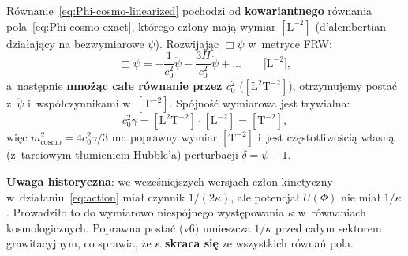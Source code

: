 \begin{remark}\label{rem:dim-mcosmo}
R\'ownanie~\eqref{eq:Phi-cosmo-linearized} pochodzi
od \textbf{kowariantnego} r\'ownania pola~\eqref{eq:Phi-cosmo-exact},
kt\'orego cz\l{}ony maj\k{a} wymiar $[\mathrm{L}^{-2}]$
(d'alembertian dzia\l{}aj\k{a}cy na bezwymiarowe $\psi$).
Rozwijaj\k{a}c $\Box\psi$ w~metryce FRW:
\[
  \Box\psi
  = -\frac{1}{c_0^2}\ddot\psi - \frac{3H}{c_0^2}\dot\psi
  + \ldots
  \qquad\bigl[\mathrm{L}^{-2}\bigr],
\]
a~nast\k{e}pnie \textbf{mno\.z\k{a}c ca\l{}e r\'ownanie przez $c_0^2$}
($[\mathrm{L}^{2}\mathrm{T}^{-2}]$), otrzymujemy posta\'c
z~$\ddot\psi$ i~wsp\'o\l{}czynnikami w~$[\mathrm{T}^{-2}]$.
Sp\'ojno\'s\'c wymiarowa jest trywialna:
\[
  c_0^2\gamma
  = [\mathrm{L}^{2}\mathrm{T}^{-2}] \cdot [\mathrm{L}^{-2}]
  = [\mathrm{T}^{-2}],
\]
wi\k{e}c $m_{\mathrm{cosmo}}^2 = 4c_0^2\gamma/3$
ma poprawny wymiar $[\mathrm{T}^{-2}]$
i~jest cz\k{e}stotliwo\'sci\k{a} w\l{}asn\k{a} (z~tarciowym
t\l{}umieniem Hubble'a) perturbacji $\delta = \psi - 1$.

\textbf{Uwaga historyczna}: we wcze\'sniejszych wersjach
cz\l{}on kinetyczny w~dzia\l{}aniu~\eqref{eq:action}
mia\l{} czynnik $1/(2\kappa)$, ale potencja\l{} $U(\Phi)$
nie mia\l{} $1/\kappa$. Prowadzi\l{}o to do wymiarowo
niespójnego wyst\k{e}powania $\kappa$ w~r\'ownaniach
kosmologicznych. Poprawna postać (v6) umieszcza
$1/\kappa$ przed ca\l{}ym sektorem grawitacyjnym,
co sprawia, \.ze $\kappa$ \textbf{skraca si\k{e}}
ze wszystkich r\'owna\'n pola.
\end{remark}

